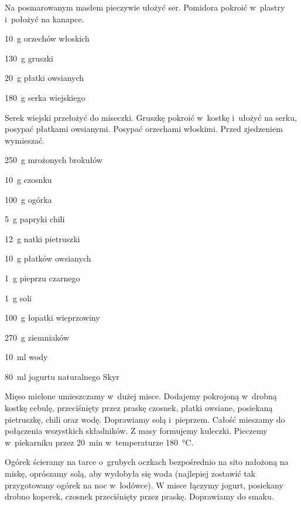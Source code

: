\documentclass[../main.tex]{subfiles}
\begin{document}
Na posmarowanym masłem pieczywie ułożyć ser. Pomidora pokroić w~plastry
i~położyć na kanapce.


\begin{Ingred}
    \item \qty{10}{\gram} orzechów włoskich
    \item \qty{130}{\gram} gruszki
    \item \qty{20}{\gram} płatki owsianych
    \item \qty{180}{\gram} serka wiejskiego
\end{Ingred}

Serek wiejski przełożyć do miseczki. Gruszkę pokroić w~kostkę i~ułożyć na
serku, posypać płatkami owsianymi. Posypać orzechami włoskimi. Przed zjedzeniem
wymieszać.


\begin{Ingred}
    \item \qty{250}{\gram} mrożonych brokułów
    \item \qty{10}{\gram} czosnku
    \item \qty{100}{\gram} ogórka
    \item \qty{5}{\gram} papryki chili
    \item \qty{12}{\gram} natki pietruszki
    \item \qty{10}{\gram} płatków owsianych
    \item \qty{1}{\gram} pieprzu czarnego
    \item \qty{1}{\gram} soli
    \item \qty{100}{\gram} łopatki wieprzowiny
    \item \qty{270}{\gram} ziemniaków
    \item \qty{10}{\milli\litre} wody
    \item \qty{80}{\milli\litre} jogurtu naturalnego Skyr
\end{Ingred}

Mięso mielone umieszczamy w~dużej misce. Dodajemy pokrojoną w~drobną kostkę
cebulę, przeciśnięty przez praskę czosnek, płatki owsiane, posiekaną
pietruszkę, chili oraz wodę. Doprawiamy solą i~pieprzem. Całość mieszamy do
połączenia wszystkich składników. Z masy formujemy kuleczki. Pieczemy
w~piekarniku przez \qty{20}{\minute} w~temperaturze \qty{180}{\celsius}.

Ogórek ścieramy na tarce o~grubych oczkach bezpośrednio na sito nałożoną na
miskę, oprószamy solą, aby wydobyła się woda (najlepiej zostawić tak
przygotowany ogórek na noc w~lodówce). W misce łączymy jogurt, posiekany drobno
koperek, czosnek przeciśnięty przez praskę. Doprawiamy do smaku.
\end{document}
